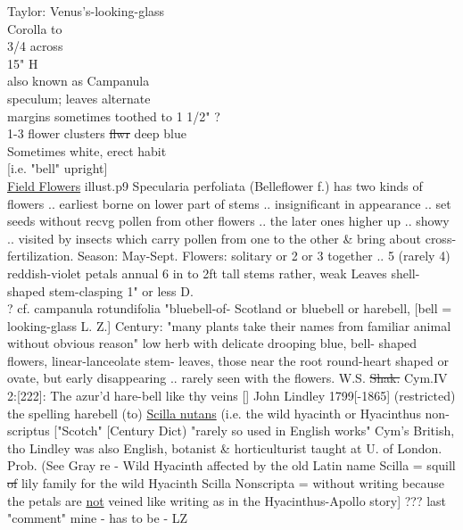 \documentclass[a4paper]{article}
\begin{document}
\begin{minipage}[t]{0.6\textwidth}
Taylor: Venus's-looking-glass\\
Corolla to\\
3/4 across\\
15" H\\


also known as Campanula\\
speculum; leaves alternate\\
margins sometimes toothed to 1 1/2" ?\\
1-3 flower clusters \sout{flwr} deep blue\\
Sometimes white, erect habit\\
{[i.e. "bell" upright]}\\
\ul{Field Flowers} illust.p9 Specularia
perfoliata (Belleflower
f.)
has two kinds of flowers .. earliest
borne on lower part of stems .. insignificant
in appearance .. set seeds without recvg
pollen from other flowers .. the later ones
higher up .. showy .. visited by insects
which carry pollen from one to the other \& bring
about cross-fertilization. Season:
May-Sept. Flowers: solitary or 2 or 3
together .. 5 (rarely 4) reddish-violet petals
annual 6 in to 2ft tall stems rather,
weak Leaves shell-shaped stem-clasping
1" or less D.\\ 
\color{red}
? cf. campanula rotundifolia "bluebell-of-
Scotland or bluebell or harebell,
[bell = looking-glass L. Z.] Century:
"many plants take their names from
familiar animal %
without obvious reason"
low herb with delicate drooping blue, bell-
shaped flowers, linear-lanceolate stem-
leaves, those near the root round-heart
shaped or ovate, but early disappearing
.. rarely seen with the flowers.
W.S. \sout{Shak.} Cym.IV 2:[222]: The azur'd hare-bell
like thy veins [] John Lindley 1799[-1865]
(restricted) the spelling harebell
(to) \ul{Scilla nutans} (i.e. the wild
hyacinth or Hyacinthus non-scriptus
["Scotch" [Century Dict) "rarely so used in English
works" Cym's British, tho Lindley 
was also English, botanist \& horticulturist
taught at U. of London. Prob. (See
Gray re - Wild Hyacinth affected
by the old Latin name Scilla = squill
\sout{of} lily family for the wild Hyacinth
Scilla Nonscripta = without writing
because the petals are \ul{not} veined like
writing as in the Hyacinthus-Apollo story]
??? last "comment" mine
- has to be - LZ
\end{minipage}
\end{document}
